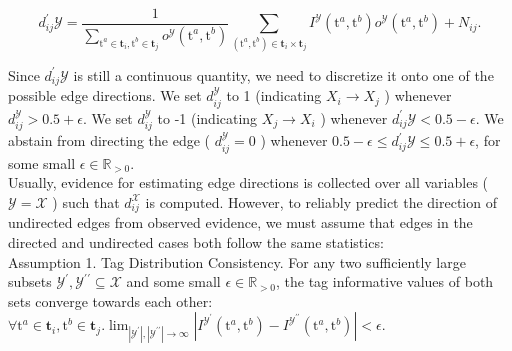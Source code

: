 \documentclass[10pt]{article}
\begin{document}
\begin{equation*}
d_{i j}^{\prime} \mathcal{Y}=\frac{1}{\sum_{\mathrm{t}^{a} \in \mathbf{t}_{i}, \mathrm{t}^{b} \in \mathbf{t}_{j}} o^{\mathcal{Y}}\left(\mathrm{t}^{a}, \mathrm{t}^{b}\right)} \sum_{\left(\mathrm{t}^{a}, \mathrm{t}^{b}\right) \in \mathbf{t}_{i} \times \mathbf{t}_{j}} I^{\mathcal{Y}}\left(\mathrm{t}^{a}, \mathrm{t}^{b}\right) o^{\mathcal{Y}}\left(\mathrm{t}^{a}, \mathrm{t}^{b}\right)+N_{i j} . \tag{2}
\end{equation*}


Since $d_{i j}^{\prime} \mathcal{Y}$ is still a continuous quantity, we need to discretize it onto one of the possible edge directions. We set $d_{i j}^{\mathcal{Y}}$ to 1 (indicating $X_{i} \rightarrow X_{j}$ ) whenever $d_{i j}^{\mathcal{Y}}>0.5+\epsilon$. We set $d_{i j}^{\mathcal{Y}}$ to -1 (indicating $X_{j} \rightarrow X_{i}$ ) whenever $d_{i j}^{\prime} \mathcal{Y}<0.5-\epsilon$. We abstain from directing the edge ( $d_{i j}^{\mathcal{Y}}=0$ ) whenever $0.5-\epsilon \leq d_{i j}^{\prime} \mathcal{Y} \leq 0.5+\epsilon$, for some small $\epsilon \in \mathbb{R}_{>0}$.\\
Usually, evidence for estimating edge directions is collected over all variables ( $\mathcal{Y}=\mathcal{X}$ ) such that $d_{i j}^{\mathcal{X}}$ is computed. However, to reliably predict the direction of undirected edges from observed evidence, we must assume that edges in the directed and undirected cases both follow the same statistics:\\
Assumption 1. Tag Distribution Consistency. For any two sufficiently large subsets $\mathcal{Y}^{\prime}, \mathcal{Y}^{\prime \prime} \subseteq \mathcal{X}$ and some small $\epsilon \in \mathbb{R}_{>0}$, the tag informative values of both sets converge towards each other: $\forall \mathrm{t}^{a} \in \mathbf{t}_{i}, \mathrm{t}^{b} \in \mathbf{t}_{j} . \lim _{\left|\mathcal{Y}^{\prime}\right|,\left|\mathcal{Y}^{\prime \prime}\right| \rightarrow \infty}\left|I^{\mathcal{Y}^{\prime}}\left(\mathrm{t}^{a}, \mathrm{t}^{b}\right)-I^{\mathcal{Y}^{\prime \prime}}\left(\mathrm{t}^{a}, \mathrm{t}^{b}\right)\right|<\epsilon$.
\end{document}
